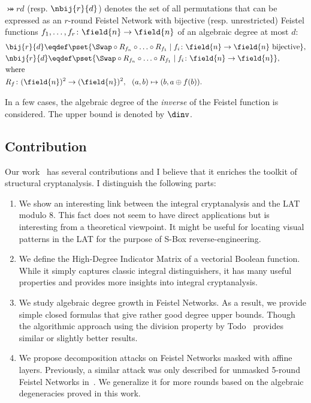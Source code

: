 \begin{definition}
    $\bij{r}{d}$ (resp. $\nbij{r}{d}$) denotes the set of all permutations that can be expressed as an $r$-round Feistel Network with bijective (resp. unrestricted) Feistel functions $f_1,\ldots,f_r\colon \field{n} \to \field{n}$ of an algebraic degree at most $d$:
    \begin{align*}
        & \bij{r}{d} \eqdef \pset{\Swap \circ R_{f_n}\circ\ldots\circ R_{f_1} \mid f_i\colon \field{n}\to\field{n}~\text{bijective}}, \\
        & \nbij{r}{d} \eqdef \pset{\Swap \circ R_{f_n}\circ\ldots\circ R_{f_1} \mid f_i\colon \field{n}\to\field{n}}, \\
        & \text{where}\\
        & R_f\colon (\field{n})^2 \to (\field{n})^2,~~ (a,b)\mapsto(b, a\oplus f(b)).
    \end{align*}
\end{definition}

In a few cases, the algebraic degree of the \emph{inverse} of the Feistel function is considered. The upper bound is denoted by $\dinv$.


\subsection{Contribution}
Our work~\cite{OurFeistel} has several contributions and I believe that it enriches the toolkit of structural cryptanalysis. I distinguish the following parts:
\begin{enumerate}
    \item We show an interesting link between the integral cryptanalysis and the LAT modulo 8. This fact does not seem to have direct applications but is interesting from a theoretical viewpoint. It might be useful for locating visual patterns in the LAT for the purpose of S-Box reverse-engineering.
    \item We define the High-Degree Indicator Matrix of a vectorial Boolean function. While it simply captures classic integral distinguishers, it has many useful properties and provides more insights into integral cryptanalysis.
    \item We study algebraic degree growth in Feistel Networks. As a result, we provide simple closed formulas that give rather good degree upper bounds. Though the algorithmic approach using the division property by Todo~\cite{division} provides similar or slightly better results.
    \item We propose decomposition attacks on Feistel Networks masked with affine layers. Previously, a similar attack was only described for unmasked 5-round Feistel Networks in~\cite{LeoFeistel}. We generalize it for more rounds based on the algebraic degeneracies proved in this work.
\end{enumerate}


